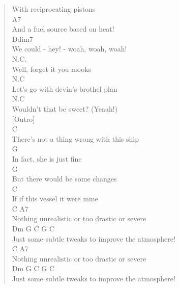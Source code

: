 \documentclass[11pt]{article}
\begin{document}
\begin{verse}
With reciprocating pistons\\
\hspace*{7em}A7\\
And a fuel source based on heat!\\
\hspace*{6em}Ddim7\\
We could - hey! - woah, woah, woah!\\
\hspace*{1em}N.C.\\
Well, forget it you mooks\\
\hspace*{1em}N.C\\
Let's go with devin's brothel plan\\
\hspace*{1em}N.C\\
Wouldn't that be sweet? (Yeaah!)\\
\vspace*{1em}
\vspace*{1em}
[Outro]\\
\vspace*{1em}
\hspace*{1em}C\\
There's not a thing wrong with this ship\\
\hspace*{1em}G\\
In fact, she is just fine\\
\hspace*{1em}G\\
But there would be some changes\\
\hspace*{1em}C\\
If if this vessel it were mine\\
\hspace*{1em}C                           A7\\
Nothing unrealistic or too drastic or severe\\
\hspace*{1em}Dm                G             C         G       C\\
Just some subtle tweaks to improve the atmosphere!\\
\hspace*{1em}C                           A7\\
Nothing unrealistic or too drastic or severe\\
\hspace*{1em}Dm                G             C         G       C\\
Just some subtle tweaks to improve the atmosphere!\\
\end{verse}
\clearpage
\end{document}
